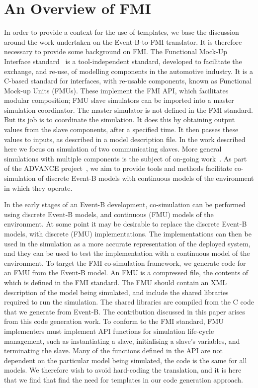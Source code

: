 \documentclass{llncs}%
\begin{document}
\section{An Overview of FMI}\label{FMI}
%
In order to provide a context for the use of templates, we base the discussion around the work undertaken on the Event-B-to-FMI translator. It is therefore necessary to provide some background on FMI. The Functional Mock-Up Interface standard~\cite{bloch2012,bloch2011,FMISTD} is a tool-independent standard, developed to facilitate the exchange, and re-use, of modelling components in the automotive industry. It is a C-based standard for interfaces, with re-usable components, known as Functional Mock-up Units (FMUs). These implement the FMI API, which facilitates modular composition; FMU slave simulators can be imported into a master simulation coordinator. The master simulator is not defined in the FMI standard. But its job is to coordinate the simulation. It does this by obtaining output values from the slave components, after a specified time. It then passes these values to inputs, as described in a model description file. In the work described here we focus on simulation of two communicating slaves.  More general simulations with multiple components is the subject of on-going work~\cite{eps360400}. As part of the ADVANCE project~\cite{advance}, we aim to provide tools and methods facilitate co-simulation of discrete Event-B models with continuous models of the environment in which they operate. 

In the early stages of an Event-B development, co-simulation can be performed using discrete Event-B models, and continuous (FMU) models of the environment. At some point it may be desirable to replace the discrete Event-B models, with discrete (FMU) implementations. The implementations can then be used in the simulation as a more accurate representation of the deployed system, and they can be used to test the implementation with a continuous model of the environment. To target the FMI co-simulation framework, we generate code for an FMU from the Event-B model. An FMU is a compressed file, the contents of which is defined in the FMI standard. The FMU should contain an XML description of the model being simulated, and include the shared libraries required to run the simulation. The shared libraries are compiled from the C code that we generate from Event-B. The contribution discussed in this paper arises from this code generation work. To conform to the FMI standard, FMU implementers must implement API functions for simulation life-cycle management, such as instantiating a slave, initialising a slave's variables, and terminating the slave. Many of the functions defined in the API are not dependent on the particular model being simulated, the code is the same for all models. We therefore wish to avoid hard-coding the translation, and it is here that we find that find the need for templates in our code generation approach.   
%
\end{document}
